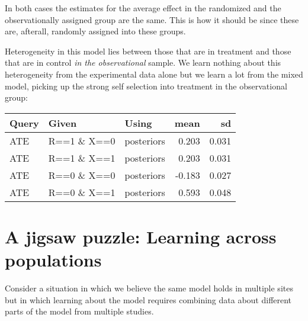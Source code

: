 \documentclass[
  12pt,
]{book}
\newenvironment{Shaded}{\begin{snugshade}}{\end{snugshade}}
\newcommand{\DataTypeTok}[1]{\textcolor[rgb]{0.13,0.29,0.53}{#1}}
\newcommand{\DecValTok}[1]{\textcolor[rgb]{0.00,0.00,0.81}{#1}}
\newcommand{\KeywordTok}[1]{\textcolor[rgb]{0.13,0.29,0.53}{\textbf{#1}}}
\newcommand{\NormalTok}[1]{#1}
\newcommand{\OperatorTok}[1]{\textcolor[rgb]{0.81,0.36,0.00}{\textbf{#1}}}
\newcommand{\StringTok}[1]{\textcolor[rgb]{0.31,0.60,0.02}{#1}}
\begin{document}
In both cases the estimates for the average effect in the randomized and the observationally assigned group are the same. This is how it should be since these are, afterall, randomly assigned into these groups.

Heterogeneity in this model lies between those that are in treatment and those that are in control \emph{in the observational} sample. We learn nothing about this heterogeneity from the experimental data alone but we learn a lot from the mixed model, picking up the strong self selection into treatment in the observational group:

\begin{tabular}{l|l|l|r|r}
\hline
Query & Given & Using & mean & sd\\
\hline
ATE & R==1 \& X==0 & posteriors & 0.203 & 0.031\\
\hline
ATE & R==1 \& X==1 & posteriors & 0.203 & 0.031\\
\hline
ATE & R==0 \& X==0 & posteriors & -0.183 & 0.027\\
\hline
ATE & R==0 \& X==1 & posteriors & 0.593 & 0.048\\
\hline
\end{tabular}

\hypertarget{a-jigsaw-puzzle-learning-across-populations}{%
\section{A jigsaw puzzle: Learning across populations}\label{a-jigsaw-puzzle-learning-across-populations}}

Consider a situation in which we believe the same model holds in multiple sites but in which learning about the model requires combining data about different parts of the model from multiple studies.

\begin{Shaded}
\end{Shaded}
\end{document}
